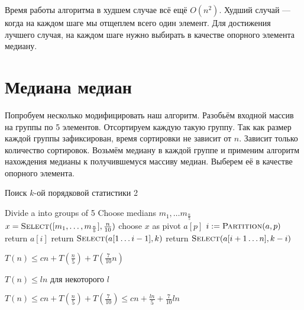 \documentclass[12pt,a4paper]{article}
\begin{document}
Время работы алгоритма в худшем случае всё ещё $O(n^2)$.
Худший случай — когда на каждом шаге мы отщеплем всего один элемент.
Для достижения лучшего случая, на каждом шаге нужно выбирать в качестве опорного элемента медиану.

\section*{Медиана медиан}
Попробуем несколько модифицировать наш алгоритм.
Разобьём входной массив на группы по 5 элементов.
Отсортируем каждую такую группу.
Так как размер каждой группы зафиксирован, время сортировки не зависит от $n$.
Зависит только количество сортировок.
Возьмём медиану в каждой группе и применим алгоритм нахождения медианы к получившемуся массиву медиан.
Выберем её в качестве опорного элемента.

\begin{algorithm}
\caption{Поиск $k$-ой порядковой статистики 2}
\begin{algorithmic}[1]
	\State Divide a into groups of 5
	\State Choose medians $m_1,\ldots m_\frac{n}{5}$
	\State $x = \textsc{Select}([m_1,\ldots, m_\frac{n}{5}], \frac{n}{10})$
	\State choose $x$ as pivot $a[p]$
	\State $i \mathrel{:=} \textsc{Partition}(a, p)$
		\State return $a[i]$	
	\EndIf
		\State return $\textsc{Select}(a[1 \ldots i - 1], k)$
	\Else
		\State return $\textsc{Select}(a[i + 1 \ldots n], k - i)$
	\EndIf
\EndFunction
\end{algorithmic}
\end{algorithm}

$T(n) \leqslant cn + T\left(\frac{n}{5}\right) + T\left( \frac{7}{10}n \right)$

$T(n) \leqslant ln$ для некоторого $l$

$T(n) \leqslant cn + T(\frac{n}{5}) + T(\frac{7}{10}) \leqslant cn + \frac{ln}{5} + \frac{7}{10}ln$
\end{document}
